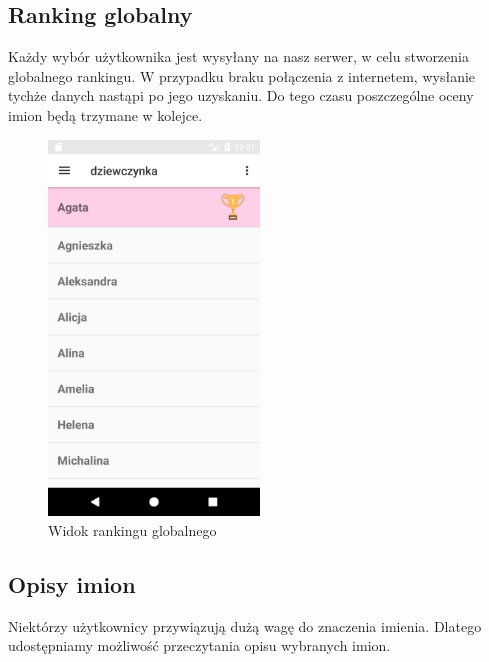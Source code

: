 \documentclass[12pt,a4paper]{article}
\begin{document}
\subsection{Ranking globalny}
Każdy wybór użytkownika jest wysyłany na nasz serwer, w celu stworzenia globalnego rankingu.
W przypadku braku połączenia z internetem, wysłanie tychże danych nastąpi po jego uzyskaniu.
Do tego czasu poszczególne oceny imion będą trzymane w kolejce.

\begin{figure}[h]
    \caption{Widok rankingu globalnego}
    \centering
    \includegraphics[width=0.5\textwidth]{top}
\end{figure}

\subsection{Opisy imion}
Niektórzy użytkownicy przywiązują dużą wagę do znaczenia imienia.
Dlatego udostępniamy możliwość przeczytania opisu wybranych imion.
\end{document}
